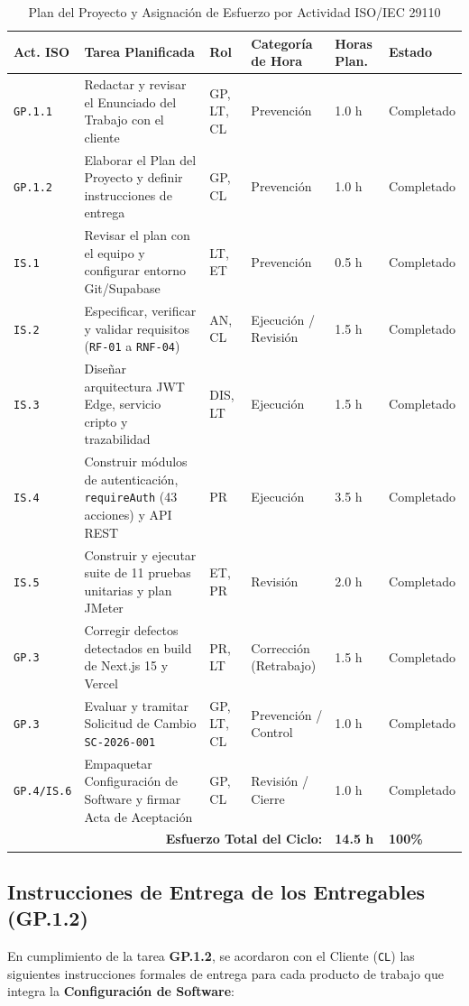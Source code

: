 \documentclass[11pt,a4paper]{article}
\begin{document}
\begin{table}[h!]
\centering
\caption{Plan del Proyecto y Asignación de Esfuerzo por Actividad ISO/IEC 29110}
\label{tab:plan}
\renewcommand{\arraystretch}{1.2}
\begin{tabular}{@{}p{1.4cm}p{6.0cm}p{1.6cm}p{2.8cm}p{1.6cm}p{2.0cm}@{}}
\toprule
\rowcolor{tableHeader}
\textbf{Act. ISO} & \textbf{Tarea Planificada} & \textbf{Rol} & \textbf{Categoría de Hora} & \textbf{Horas Plan.} & \textbf{Estado} \\
\midrule
\texttt{GP.1.1} & Redactar y revisar el Enunciado del Trabajo con el cliente & GP, LT, CL & Prevención & 1.0 h & Completado \\
\texttt{GP.1.2} & Elaborar el Plan del Proyecto y definir instrucciones de entrega & GP, CL & Prevención & 1.0 h & Completado \\
\texttt{IS.1} & Revisar el plan con el equipo y configurar entorno Git/Supabase & LT, ET & Prevención & 0.5 h & Completado \\
\texttt{IS.2} & Especificar, verificar y validar requisitos (\texttt{RF-01} a \texttt{RNF-04}) & AN, CL & Ejecución / Revisión & 1.5 h & Completado \\
\texttt{IS.3} & Diseñar arquitectura JWT Edge, servicio cripto y trazabilidad & DIS, LT & Ejecución & 1.5 h & Completado \\
\texttt{IS.4} & Construir módulos de autenticación, \texttt{requireAuth} (43 acciones) y API REST & PR & Ejecución & 3.5 h & Completado \\
\texttt{IS.5} & Construir y ejecutar suite de 11 pruebas unitarias y plan JMeter & ET, PR & Revisión & 2.0 h & Completado \\
\texttt{GP.3} & Corregir defectos detectados en build de Next.js 15 y Vercel & PR, LT & Corrección (Retrabajo) & 1.5 h & Completado \\
\texttt{GP.3} & Evaluar y tramitar Solicitud de Cambio \texttt{SC-2026-001} & GP, LT, CL & Prevención / Control & 1.0 h & Completado \\
\texttt{GP.4/IS.6} & Empaquetar Configuración de Software y firmar Acta de Aceptación & GP, CL & Revisión / Cierre & 1.0 h & Completado \\
\midrule
\multicolumn{4}{r}{\textbf{Esfuerzo Total del Ciclo:}} & \textbf{14.5 h} & \textbf{100\%} \\
\bottomrule
\end{tabular}
\end{table}

\subsection{Instrucciones de Entrega de los Entregables (GP.1.2)}
En cumplimiento de la tarea \textbf{GP.1.2}, se acordaron con el Cliente (\texttt{CL}) las siguientes instrucciones formales de entrega para cada producto de trabajo que integra la \textbf{Configuración de Software}:
\end{document}
